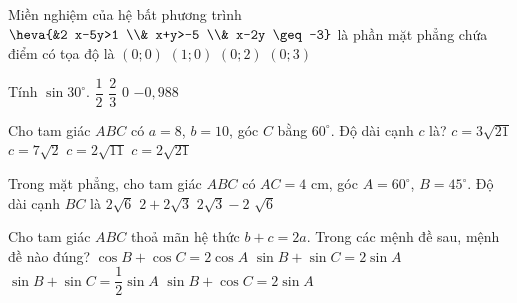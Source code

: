 \begin{ex}%
Miền nghiệm của hệ bất phương trình $\heva{&2 x-5y>1 \\& x+y>-5 \\& x-2y \geq-3}$ là phần mặt phẳng chứa điểm có tọa độ là
\choice
{$(0; 0)$}
{\True $(1; 0)$}
{$(0; 2)$}
{$(0; 3)$}
\end{ex}
\begin{ex}%
Tính $\sin 30^{\circ}$.
\choice
{\True $\dfrac{1}{2}$}
{$\dfrac{2}{3}$}
{$0$}
{$-0{,}988$}
\end{ex}
\begin{ex}%
Cho tam giác $ABC$ có $a=8$, $b=10$, góc $C$ bằng $60^{\circ}$. Độ dài cạnh $c$ là?
\choice
{$c=3\sqrt{21}$}
{$c=7\sqrt{2}$}
{$c=2\sqrt{11}$}
{\True $c=2\sqrt{21}$}
\end{ex}
\begin{ex}%
Trong mặt phẳng, cho tam giác $ABC$ có $AC=4$ cm, góc $A=60^{\circ}$, $B=45^{\circ}$. Độ dài cạnh $BC$ là
\choice
{\True $2\sqrt{6}$}
{$2+2\sqrt{3}$}
{$2\sqrt{3}-2$}
{$\sqrt{6}$}
\end{ex}
\begin{ex}%
Cho tam giác $ABC$ thoả mãn hệ thức $b+c=2a$. Trong các mệnh đề sau, mệnh đề nào đúng?
\choice
{$\cos B+\cos C=2\cos A$}
{\True $\sin B+\sin C=2\sin A$}
{$\sin B+\sin C=\dfrac{1}{2}\sin A$}
{$\sin B+\cos C=2 \sin A$}
\end{ex}
